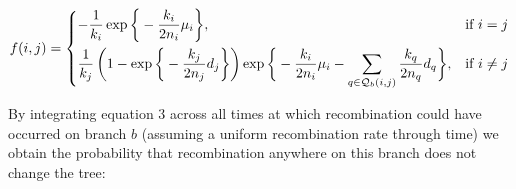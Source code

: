 \documentclass[11pt]{article}
\begin{document}
\begin{equation}
\begin{aligned}	
	f(i,j) = 
	\begin{dcases}
		- \frac{1}{k_i} \exp \bigg\{-\frac{k_i}{2n_i}\mu_i \bigg\}, 
		& \text{if } i=j\\
		\frac{1}{k_j} \left(1 - \exp \bigg\{ -\frac{k_j}{2n_j} d_j \bigg\} 
		\right)
		\exp \bigg\{ -\frac{k_i}{2n_i}\mu_i - 
		\sum_{q \in \mathcal{Q}_b(i,j)} \frac{k_q}{2n_q} d_q \bigg \}, 
		& \text{if } i\ne j\\
	\end{dcases}
\end{aligned}
\end{equation}





\noindent By integrating equation 3 across all times at which recombination could
have occurred on branch $b$ (assuming a uniform recombination rate through time) 
we obtain the probability that recombination anywhere on this branch does not 
change the tree:
\end{document}
